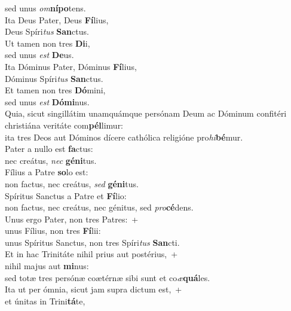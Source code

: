 \evenverse sed unus \textit{om}\textbf{ní}\textbf{po}tens.\\
\oddverse Ita Deus Pater, Deus \textbf{Fí}lius,~\*\\
\oddverse Deus Spíri\textit{tus} \textbf{San}ctus.\\
\evenverse Ut tamen non tres \textbf{Di}i,~\*\\
\evenverse sed unus \textit{est} \textbf{De}us.\\
\oddverse Ita Dóminus Pater, Dóminus \textbf{Fí}lius,~\*\\
\oddverse Dóminus Spíri\textit{tus} \textbf{San}ctus.\\
\evenverse Et tamen non tres \textbf{Dó}mini,~\*\\
\evenverse sed unus \textit{est} \textbf{Dó}\textbf{mi}nus.\\
\oddverse Quia, sicut singillátim unamquámque persónam Deum ac Dóminum confitéri christiána veritáte com\textbf{pél}limur:~\*\\
\oddverse ita tres Deos aut Dóminos dícere cathólica religióne pro\textit{hi}\textbf{bé}mur.\\
\evenverse Pater a nullo est \textbf{fa}ctus:~\*\\
\evenverse nec creátus, \textit{nec} \textbf{gé}\textbf{ni}tus.\\
\oddverse Fílius a Patre \textbf{so}lo est:~\*\\
\oddverse non factus, nec creátus, \textit{sed} \textbf{gé}\textbf{ni}tus.\\
\evenverse Spíritus Sanctus a Patre et \textbf{Fí}lio:~\*\\
\evenverse non factus, nec creátus, nec génitus, sed \textit{pro}\textbf{cé}dens.\\
\oddverse Unus ergo Pater, non tres Patres:~+\\
\oddverse  unus Fílius, non tres \textbf{Fí}lii:~\*\\
\oddverse unus Spíritus Sanctus, non tres Spíri\textit{tus} \textbf{San}cti.\\
\evenverse Et in hac Trinitáte nihil prius aut postérius,~+\\
\evenverse  nihil majus aut \textbf{mi}nus:~\*\\
\evenverse sed totæ tres persónæ coætérnæ sibi sunt et co\textit{æ}\textbf{quá}les.\\
\oddverse Ita ut per ómnia, sicut jam supra dictum est,~+\\
\oddverse  et únitas in Trini\textbf{tá}te,~\*\\
